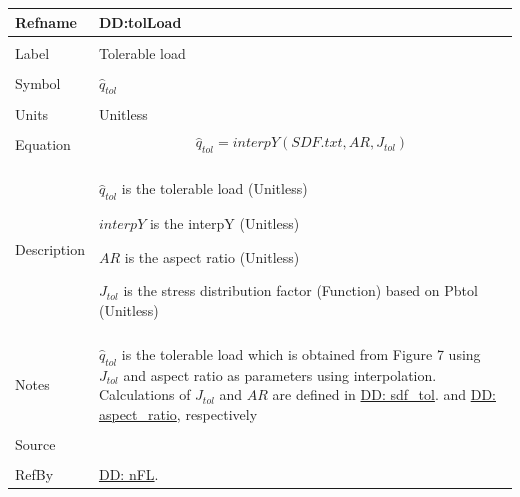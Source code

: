 \documentclass[12pt]{article}
\begin{document}
\noindent \begin{minipage}{\textwidth}
\begin{tabular}{p{} p{}}
\toprule \textbf{Refname} & \textbf{DD:tolLoad}
\label{DD:tolLoad}
\\ \midrule \\
Label & Tolerable load
\\ \midrule \\
Symbol & ${\hat{q}_{tol}}$
\\ \midrule \\
Units & Unitless
\\ \midrule \\
Equation & \begin{displaymath}
           {\hat{q}_{tol}}=interpY\left(SDF.txt,AR,{J_{tol}}\right)
           \end{displaymath}
\\ \midrule \\
Description & \begin{symbDescription}
              \item{${\hat{q}_{tol}}$ is the tolerable load (Unitless)}
              \item{$interpY$ is the interpY (Unitless)}
              \item{$AR$ is the aspect ratio (Unitless)}
              \item{${J_{tol}}$ is the stress distribution factor (Function) based on Pbtol (Unitless)}
              \end{symbDescription}
\\ \midrule \\
Notes & ${\hat{q}_{tol}}$ is the tolerable load which is obtained from Figure 7 using ${J_{tol}}$ and aspect ratio as parameters using interpolation. Calculations of ${J_{tol}}$ and $AR$ are defined in \hyperref[DD:sdf.tol]{DD: sdf\_tol}. and \hyperref[DD:aspect.ratio]{DD: aspect\_ratio}, respectively
\\ \midrule \\
Source & \cite{astm2009}
\\ \midrule \\
RefBy & \hyperref[DD:nFL]{DD: nFL}.
\\ \bottomrule \end{tabular}
\end{minipage}
\par~
\end{document}
